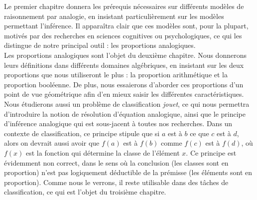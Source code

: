 Le premier chapitre donnera les prérequis nécessaires sur différents modèles de
raisonnement par analogie, en insistant particulièrement sur les modèles
permettant l'inférence. Il apparaîtra clair que ces modèles sont, pour la
plupart, motivés par des recherches en sciences cognitives ou psychologiques,
ce qui les distingue de notre principal outil : les proportions analogiques.\\

Les proportions analogiques sont l'objet du deuxième chapitre. Nous donnerons
leurs définitions dans différents domaines algébriques, en insistant sur les
deux proportions que nous utiliseront le plus : la proportion arithmétique et
la proportion booléenne. De plus, nous essaierons d'aborder ces proportions
d'un point de vue géométrique afin d'en mieux saisir les différentes
caractéristiques. Nous étudierons aussi un problème de classification
\textit{jouet}, ce qui nous permettra d'introduire la notion de résolution
d'équation analogique, ainsi que le principe d'inférence analogique qui est
sous-jacent à toutes  nos recherches. Dans un contexte de classification, ce
principe stipule que si $a$ est à $b$ ce que $c$ est à $d$, alors on devrait
aussi avoir que $f(a)$ est à $f(b)$ comme $f(c)$ est à $f(d)$, où $f(x)$ est la
fonction qui détermine la classe de l'élément $x$. Ce principe est évidemment
non correct, dans le sens où la conclusion (les classes sont en proportion)
n'est pas logiquement déductible de la prémisse (les éléments sont en
proportion). Comme nous le verrons, il reste utilisable dans des tâches de
classification, ce qui est l'objet du troisième chapitre.\\


